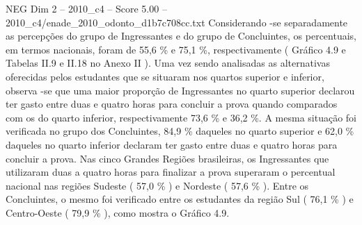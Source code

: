 \begin{textsample}{NEG Dim 2 – 2010\_c4 – Score 5.00 – 2010\_c4/enade\_2010\_odonto\_d1b7c708cc.txt}
Considerando -se separadamente as percepções do grupo de Ingressantes e do grupo de Concluintes, os percentuais, em termos nacionais, foram de 55,6 \% e 75,1 \%, respectivamente ( Gráfico 4.9 e Tabelas II.9 e II.18 no Anexo II ).
Uma vez sendo analisadas as alternativas oferecidas pelos estudantes que se situaram nos quartos superior e inferior, observa -se que uma maior proporção de Ingressantes no quarto superior declarou ter gasto entre duas e quatro horas para concluir a prova quando comparados com os do quarto inferior, respectivamente 73,6 \% e 36,2 \%.
A mesma situação foi verificada no grupo dos Concluintes, 84,9 \% daqueles no quarto superior e 62,0 \% daqueles no quarto inferior declaram ter gasto entre duas e quatro horas para concluir a prova.
Nas cinco Grandes Regiões brasileiras, os Ingressantes que utilizaram duas a quatro horas para finalizar a prova superaram o percentual nacional nas regiões Sudeste ( 57,0 \% ) e Nordeste ( 57,6 \% ).
Entre os Concluintes, o mesmo foi verificado entre os estudantes da região Sul ( 76,1 \% ) e Centro-Oeste ( 79,9 \% ), como mostra o Gráfico 4.9.

\end{textsample}
